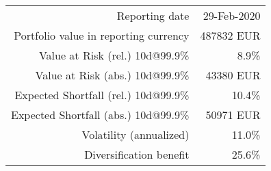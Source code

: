 \center
\label{table_port_var}
\begin{tabular}{r r}
\rowcolor{cblightblue}
Reporting date & 29-Feb-2020\\
Portfolio value in reporting currency &    487832 EUR\\
\rowcolor{cblightblue}
Value at Risk (rel.) 10d@99.9\% &       8.9\%\\
Value at Risk (abs.) 10d@99.9\% &     43380 EUR\\
\rowcolor{cblightblue}
Expected Shortfall (rel.) 10d@99.9\% &      10.4\%\\
Expected Shortfall (abs.) 10d@99.9\% &     50971 EUR\\
\rowcolor{cblightblue}
Volatility (annualized) & 11.0\%\\
Diversification benefit &      25.6\%\\ 
\end{tabular}
